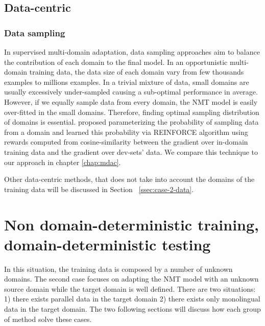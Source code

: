 \subsection{Data-centric}
\subsubsection{Data sampling}
In supervised multi-domain adaptation, data sampling approaches aim to balance the contribution of each domain to the final model. In an opportunistic multi-domain training data, the data size of each domain vary from few thousands examples to millions examples. In a trivial mixture of data, small domains are usually excessively under-sampled causing a sub-optimal performance in average. However, if we equally sample data from every domain, the NMT model is easily over-fitted in the small domains. Therefore, finding optimal sampling distribution of domains is essential. \citet{Wang20balancing} proposed parameterizing the probability of sampling data from a domain and learned this probability via REINFORCE algorithm \citet{Williams92simple} using rewards computed from cosine-similarity between the gradient over in-domain training data and the gradient over dev-sets' data. We compare this technique to our approach in chapter \ref{chap:mdac}.

Other data-centric methods, that does not take into account the domains of the training data will be discussed in Section ~\ref{ssec:case-2-data}.
\section{Non domain-deterministic training, domain-deterministic testing}
\label{sec:case2}
In this situation, the training data is composed by a number of unknown domains. The second case focuses on adapting the NMT model with an unknown source domain while the target domain is well defined. There are two situations: 1) there exists parallel data in the target domain 2) there exists only monolingual data in the target domain. The two following sections will discuss how each group of method solve these cases.
